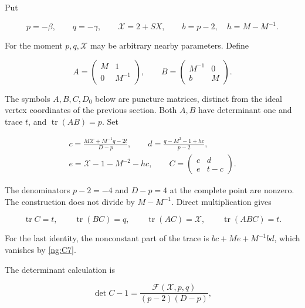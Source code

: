 Put

\begin{equation}\label{ng:C5}
p=-\beta,\qquad q=-\gamma,\qquad \mathcal X=2+SX,
 \qquad b=p-2,\quad h=M-M^{-1}.
\end{equation}

For the moment \(p,q,\mathcal X\) may be arbitrary nearby parameters. Define

\begin{equation}\label{ng:C6}
A=\begin{pmatrix}M&1\\0&M^{-1}\end{pmatrix},
 \qquad
 B=\begin{pmatrix}M^{-1}&0\\b&M\end{pmatrix}.
\end{equation}

The symbols $A,B,C,D_0$ below are puncture matrices, distinct from
the ideal vertex coordinates of the previous section. Both $A,B$
have determinant one and trace \(t\), and \(\operatorname{tr}(AB)=p\). Set

\begin{equation}\label{ng:C7}
\begin{gathered}
 c=\frac{M\mathcal X+M^{-1}q-2t}{D-p},\qquad
 d=\frac{q-M^2-1+hc}{p-2},\\
 e=\mathcal X-1-M^{-2}-hc,\qquad
 C=\begin{pmatrix}c&d\\e&t-c\end{pmatrix}.
 \end{gathered}
\end{equation}

The denominators \(p-2=-4\) and \(D-p=4\) at the complete point are nonzero. The construction does not divide by \(M-M^{-1}\). Direct multiplication gives

\begin{equation}\label{ng:C8}
\operatorname{tr}C=t,\qquad
 \operatorname{tr}(BC)=q,\qquad
 \operatorname{tr}(AC)=\mathcal X,\qquad
 \operatorname{tr}(ABC)=t.
\end{equation}

For the last identity, the nonconstant part of the trace is
\(bc+Me+M^{-1}bd\), which vanishes by \eqref{ng:C7}.

The determinant calculation is

\begin{equation}\label{ng:C9}
\det C-1=\frac{\mathcal F(\mathcal X,p,q)}{(p-2)(D-p)},
\end{equation}

